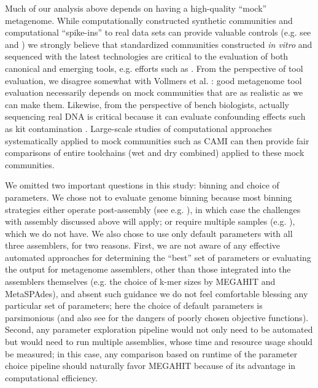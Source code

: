 \documentclass[11pt]{article}
\begin{document}
Much of our analysis above depends on having a high-quality ``mock''
metagenome.  While computationally constructed synthetic communities
and computational ``spike-ins'' to real data sets can provide valuable
controls (e.g. see \cite{metag_one} and \cite{ahowe2014}) we strongly
believe that standardized communities constructed {\em in vitro} and
sequenced with the latest technologies are critical to the evaluation
of both canonical and emerging tools, e.g. efforts such as
\cite{Brown2017}. From the perspective of tool evaluation, we
disagree somewhat with Vollmers et al. \cite{Vollmers2017}: good
metagenome tool evaluation necessarily depends on mock communities
that are as realistic as we can make them.  Likewise, from the
perspective of bench biologists, actually sequencing real DNA is
critical because it can evaluate confounding effects such as kit
contamination \cite{Salter2014}.  Large-scale studies of computational
approaches systematically applied to mock communities such as CAMI
\cite{CAMI} can then provide fair comparisons of entire toolchains
(wet and dry combined) applied to these mock communities.


We omitted two important questions in this study: binning and choice
of parameters.  We chose not to evaluate genome binning because most
binning strategies either operate post-assembly (see
e.g. \cite{laczny2017busybee}), in which case the challenges with
assembly discussed above will apply; or require multiple samples
(e.g. \cite{Cleary2015}), which we do not have.  We also chose to use
only default parameters with all three assemblers, for two reasons.
First, we are not aware of any effective automated approaches for
determining the ``best'' set of parameters or evaluating the output
for metagenome assemblers, other than those integrated into the
assemblers themselves (e.g. the choice of k-mer sizes by MEGAHIT and
MetaSPAdes), and absent such guidance we do not feel comfortable
blessing any particular set of parameters; here the choice of default
parameters is parsimonious (and also see \cite{Greshake2015} for the
dangers of poorly chosen objective functions).  Second, any parameter
exploration pipeline would not only need to be automated but would
need to run multiple assemblies, whose time and resource usage should
be measured; in this case, any comparison based on runtime of the
parameter choice pipeline should naturally favor MEGAHIT because of
its advantage in computational efficiency.
\end{document}
